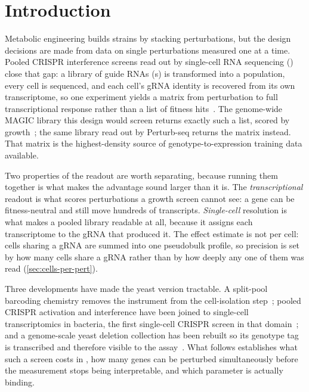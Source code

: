 
\section{Introduction}
\label{sec:intro}

Metabolic engineering builds strains by stacking perturbations, but the design
decisions are made from data on single perturbations measured one at a time.
Pooled CRISPR interference screens read out by single-cell RNA sequencing
() close that gap: a library of guide RNAs (s) is
transformed into a population, every cell is sequenced, and each cell's gRNA
identity is recovered from its own transcriptome, so one experiment yields a
matrix from perturbation to full transcriptional response rather than a list of
fitness hits~\citep{dixitPerturbSeqDissectingMolecular2016}. The genome-wide
MAGIC library this design would screen returns exactly such a list, scored by
growth~\citep{lianMultifunctionalGenomewideCRISPR2019}; the same library read out
by Perturb-seq returns the matrix instead. That matrix is the highest-density
source of genotype-to-expression training data available.

Two properties of the readout are worth separating, because running them
together is what makes the advantage sound larger than it is. The
\emph{transcriptional} readout is what scores perturbations a growth screen
cannot see: a gene can be fitness-neutral and still move hundreds of transcripts.
\emph{Single-cell} resolution is what makes a pooled library readable at all,
because it assigns each transcriptome to the gRNA that produced it. The effect
estimate is not per cell: cells sharing a gRNA are summed into one pseudobulk
profile, so precision is set by how many cells share a gRNA rather than by how
deeply any one of them was read (\cref{sec:cells-per-pert}).

Three developments have made the yeast version tractable. A split-pool barcoding
chemistry removes the instrument from the cell-isolation
step~\citep{brettnerUltraHighthroughputMassively2024}; pooled CRISPR activation
and interference have been joined to single-cell transcriptomics in bacteria,
the first single-cell CRISPR screen in that
domain~\citep{brandnerPooledSinglecellCRISPRa2025}; and a genome-scale yeast
deletion collection has been rebuilt so its genotype tag is transcribed and
therefore visible to the
assay~\citep{nadal-ribellesSinglecellResolvedGenotypephenotype2025}. What follows
establishes what such a screen costs in , how many genes can
be perturbed simultaneously before the measurement stops being interpretable, and
which parameter is actually binding.


